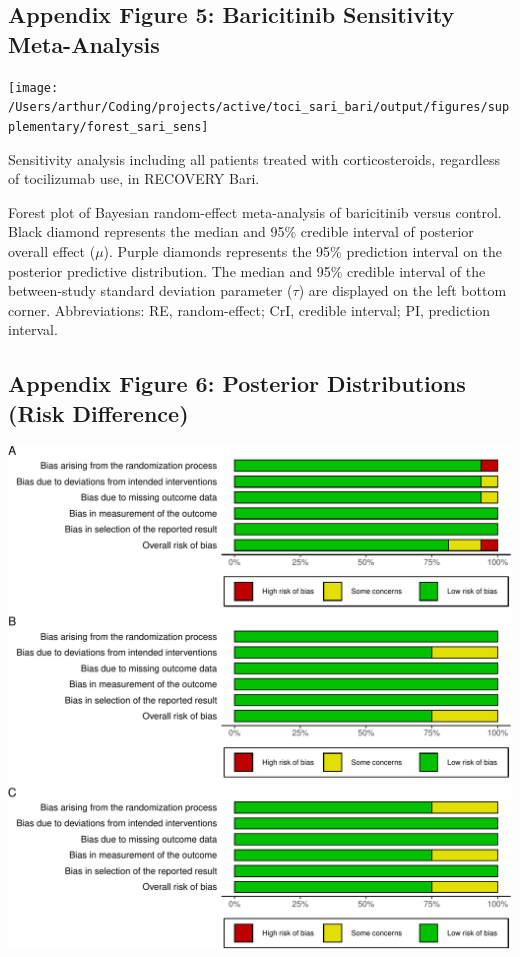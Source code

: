 \documentclass[
  12pt,
]{article}
\begin{document}
\newpage

\hypertarget{appendix-figure-5-baricitinib-sensitivity-meta-analysis}{%
\subsection{Appendix Figure 5: Baricitinib Sensitivity
Meta-Analysis}\label{appendix-figure-5-baricitinib-sensitivity-meta-analysis}}

\begin{center}\texttt{[image: /Users/arthur/Coding/projects/active/toci\_sari\_bari/output/figures/supplementary/forest\_sari\_sens]} \end{center}

Sensitivity analysis including all patients treated with
corticosteroids, regardless of tocilizumab use, in RECOVERY Bari.

Forest plot of Bayesian random-effect meta-analysis of baricitinib
versus control. Black diamond represents the median and 95\% credible
interval of posterior overall effect (\(\mu\)). Purple diamonds
represents the 95\% prediction interval on the posterior predictive
distribution. The median and 95\% credible interval of the between-study
standard deviation parameter (\(\tau\)) are displayed on the left bottom
corner. Abbreviations: RE, random-effect; CrI, credible interval; PI,
prediction interval.

\newpage

\hypertarget{appendix-figure-6-posterior-distributions-risk-difference}{%
\subsection{Appendix Figure 6: Posterior Distributions (Risk
Difference)}\label{appendix-figure-6-posterior-distributions-risk-difference}}

\begin{center}\includegraphics{supplementary_material_files/figure-latex/unnamed-chunk-8-1} \end{center}
\end{document}
